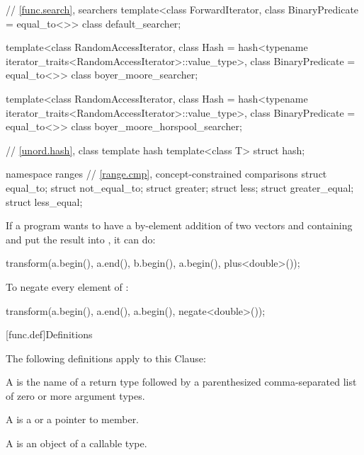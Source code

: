 \begin{codeblock}
{  // \ref{func.search}, searchers
  template<class ForwardIterator, class BinaryPredicate = equal_to<>>
    class default_searcher;

  template<class RandomAccessIterator,
           class Hash = hash<typename iterator_traits<RandomAccessIterator>::value_type>,
           class BinaryPredicate = equal_to<>>
    class boyer_moore_searcher;

  template<class RandomAccessIterator,
           class Hash = hash<typename iterator_traits<RandomAccessIterator>::value_type>,
           class BinaryPredicate = equal_to<>>
    class boyer_moore_horspool_searcher;

  // \ref{unord.hash}, class template hash
  template<class T>
    struct hash;

  namespace ranges {
    // \ref{range.cmp}, concept-constrained comparisons
    struct equal_to;
    struct not_equal_to;
    struct greater;
    struct less;
    struct greater_equal;
    struct less_equal;
  }
}
\end{codeblock}

\pnum
\begin{example}
If a \Cpp{} program wants to have a by-element addition of two vectors 
and  containing  and put the result into ,
it can do:
\begin{codeblock}
transform(a.begin(), a.end(), b.begin(), a.begin(), plus<double>());
\end{codeblock}
\end{example}

\pnum
\begin{example}
To negate every element of :
\begin{codeblock}
transform(a.begin(), a.end(), a.begin(), negate<double>());
\end{codeblock}
\end{example}

[func.def]{Definitions}

\pnum
The following definitions apply to this Clause:

\pnum
A  is the name of a return type followed by a
parenthesized comma-separated list of zero or more argument types.

\pnum
A  is a  or a pointer to member.

\pnum
A  is an object of a callable type.

